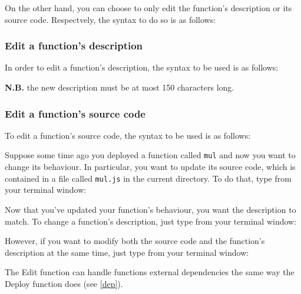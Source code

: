 On the other hand, you can choose to only edit the function's description or its source code. Respectvely, the syntax to do so is as follows:
\begin{center}
\end{center}
\subsubsection{Edit a function's description}
In order to edit a function's description, the syntax to be used is as follows:
\begin{center}
\end{center}
\textbf{N.B.} the new description must be at most 150 characters long. \\

\subsubsection{Edit a function's source code}
To edit a function's source code, the syntax to be used is as follows:
\begin{center}
\end{center}

Suppose some time ago you deployed a function called \texttt{mul} and now you want to change its behaviour. In particular, you want to update its source code, which is contained in a file called \texttt{mul.js} in the current directory. To do that, type from your terminal window:
\begin{center}
\end{center}
Now that you've updated your function's behaviour, you want the description to match. To change a function's description, just type from your terminal window:
\begin{center}
\end{center}
However, if you want to modify both the source code and the function's description at the same time, just type from your terminal window:
\begin{center}
\end{center}
The Edit function can handle functions external dependencies the same way the Deploy function does (see \ref{dep}). 

